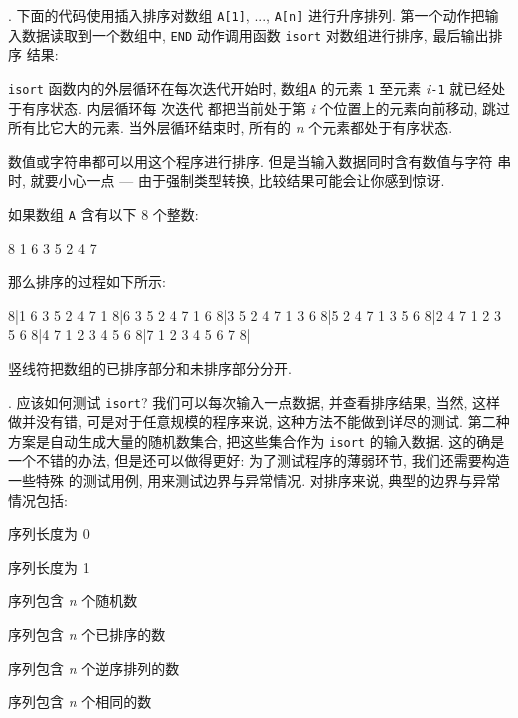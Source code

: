 . 下面的代码使用插入排序对数组 \texttt{A[1]}, ...,%
%
\texttt{A[n]} 进行升序排列. 第一个动作把输入数据读取到一个数组中,
\texttt{END} 动作调用函数 \texttt{isort} 对数组进行排序, 最后输出排序
结果:
\texttt{isort} 函数内的外层循环在每次迭代开始时, 数组\texttt{A} 的元素
\texttt{1} 至元素 \textit{i}\texttt{-1} 就已经处于有序状态. 内层循环每
次迭代
都把当前处于第 \textit{i} 个位置上的元素向前移动, 跳过所有比它大的元素. 
当外层循环结束时, 所有的 \textit{n} 个元素都处于有序状态.

数值或字符串都可以用这个程序进行排序. 但是当输入数据同时含有数值与字符
串时, 就要小心一点 --- 由于强制类型转换, 比较结果可能会让你感到惊讶.

如果数组 \texttt{A} 含有以下 8 个整数:
\begin{file}
    8 1 6 3 5 2 4 7
\end{file}
那么排序的过程如下所示:
\begin{file}
    8|1 6 3 5 2 4 7
    1 8|6 3 5 2 4 7
    1 6 8|3 5 2 4 7
    1 3 6 8|5 2 4 7
    1 3 5 6 8|2 4 7
    1 2 3 5 6 8|4 7
    1 2 3 4 5 6 8|7
    1 2 3 4 5 6 7 8|
\end{file}
竖线符把数组的已排序部分和未排序部分分开.

. 应该如何测试 \texttt{isort}? 我们可以每次输入一点数据,
并查看排序结果, 当然, 这样做并没有错, 可是对于任意规模的程序来说, 
这种方法不能做到详尽的测试. 第二种方案是自动生成大量的随机数集合, 
把这些集合作为 \texttt{isort} 的输入数据. 这的确是一个不错的办法,
但是还可以做得更好: 为了测试程序的薄弱环节, 我们还需要构造一些特殊
的测试用例, 用来测试边界与异常情况.
 对排序来说, 典型的边界与异常情况包括:
\begin{pattern}
\indent 序列长度为 0 \par
\indent 序列长度为 1 \par
\indent 序列包含 \textit{n} 个随机数 \par
\indent 序列包含 \textit{n} 个已排序的数 \par
\indent 序列包含 \textit{n} 个逆序排列的数 \par
\indent 序列包含 \textit{n} 个相同的数
\end{pattern}

